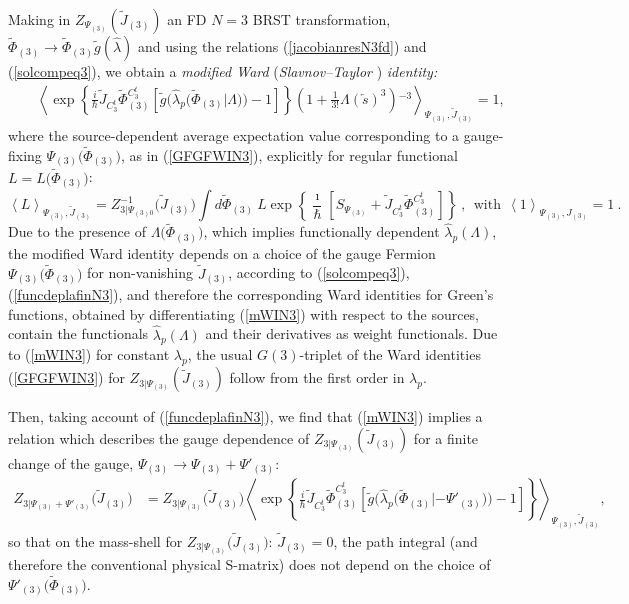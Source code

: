 \documentclass[10pt]{article}
\begin{document}
Making in $Z_{\Psi_{(3)}}(\widetilde{J}_{(3)})$ an FD $N=3$ BRST  transformation,
$\widetilde{\Phi}_{(3)} \to \widetilde{\Phi}_{(3)}\tilde{g}(\hat{\lambda})$
and using the relations (\ref{jacobianresN3fd}) and (\ref{solcompeq3}),
we obtain a \emph{modified Ward} (\emph{Slavnov--Taylor}%
) \emph{identity:}%
\begin{eqnarray}
&& \left\langle \exp\left\{ \frac{i}{\hbar}\widetilde{J}_{C^t_3}\widetilde{\Phi}{}^{C^t_3}_{(3)}\left[ \tilde{g}\big(\hat{\lambda}_p\big(\widetilde{\Phi}_{(3)}|\Lambda\big)\big)-1\right]\right\}  \left(  1+\frac{1}{3!}\Lambda(\overleftarrow
{s})^{3}\right)  {}^{-3}\right\rangle _{\Psi_{(3)},\widetilde{J}_{(3)}} =1, \label{mWIN3}%
\end{eqnarray}
where the  source-dependent average expectation value corresponding to a gauge-fixing
$\Psi_{(3)}\big(\widetilde{\Phi}_{(3)}\big)$, as in (\ref{GFGFWIN3}), explicitly for regular functional $L=L\big( \widetilde{\Phi}_{(3)}\big)$:
\begin{equation}
\left\langle L\right\rangle _{\Psi_{(3)},\widetilde{J}_{(3)}}=Z_{3|\Psi_{(3)0}}^{-1}\big(\widetilde{J}_{(3)}\big)\int d \widetilde{\Phi}_{(3)}
\ L  \exp\left\{  \frac{\imath}{\hbar}\left[
{{S}}_{\Psi_{(3)}}  +\widetilde{J}_{C_3^t} \widetilde{\Phi}{}^{C_3^t}_{(3)}\right]  \right\}
\ ,\ \ \mathrm{with\ \ }\left\langle 1\right\rangle _{\Psi_{(3)},J_{(3)}}=1\ . \label{aexvN3}%
\end{equation}
Due to the presence of $\Lambda\big(\widetilde{\Phi}_{(3)}\big)$, which implies functionally dependent
$\hat{\lambda}_{p}(\Lambda)$, the modified Ward identity depends on a choice
of the gauge Fermion $\Psi_{(3)}\big(\widetilde{\Phi}_{(3)}\big)$ for non-vanishing
$\widetilde{J}_{(3)}$, according to (\ref{solcompeq3}), (\ref{funcdeplafinN3}),
and therefore the corresponding Ward identities for Green's functions, obtained
by differentiating (\ref{mWIN3}) with respect to the sources, contain the functionals
$\hat{\lambda}_{p}(\Lambda)$ and their derivatives as weight functionals.
Due to (\ref{mWIN3}) for constant ${\lambda}_{p}$, the usual $G(3)$-triplet
of the Ward identities (\ref{GFGFWIN3}) for $Z_{3|\Psi_{(3)}}(\widetilde{J}_{(3)})$ follow
from the first order in $\lambda_{p}$.

Then, taking account of (\ref{funcdeplafinN3}),
we find that (\ref{mWIN3}) implies a relation which describes
the gauge dependence of $Z_{3|\Psi_{(3)}}(\widetilde{J}_{(3)})$ for a finite change
of the gauge, $\Psi_{(3)}\rightarrow \Psi_{(3)}+ \Psi'_{(3)}$:%
\begin{align}
Z_{3|\Psi_{(3)}+ \Psi'_{(3)}}\big(\widetilde{J}_{(3)}\big)  &  =Z_{3|\Psi_{(3)}}\big(\widetilde{J}_{(3)}\big)\left\langle\exp\left\{ \frac{i}{\hbar}\widetilde{J}_{C^t_3}\widetilde{\Phi}^{C^t_3}_{(3)}\left[ \tilde{g}\big(\hat{\lambda}_p\big(\widetilde{\Phi}_{(3)}|-\Psi'_{(3)}\big)\big)-1\right]\right\}
\right\rangle _{\Psi_{(3)},\widetilde{J}_{(3)}} , \label{GDInewN3}%
\end{align}
so that on the mass-shell for $Z_{3|\Psi_{(3)}}\big(\widetilde{J}_{(3)}\big)$:  $\widetilde{J}_{(3)}=0$, the path integral (and therefore
the conventional physical S-matrix) does not depend on the choice
of $\Psi'_{(3)}\big(\widetilde{\Phi}_{(3)}\big)$.
\end{document}
